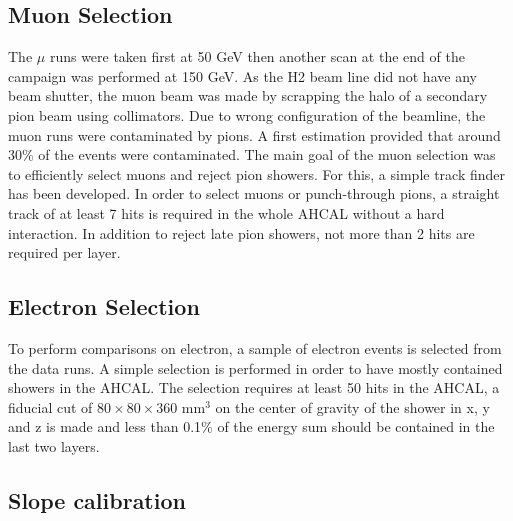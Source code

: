 \documentclass[twoside,a4paper,11pt]{article}
\begin{document}
\subsection{Muon Selection}

The $\mu$ runs were taken first at 50 GeV then another scan at the end of the campaign was performed at 150 GeV. As the H2 beam line did not have any beam shutter, the muon beam was made by scrapping the halo of a secondary pion beam using collimators. Due to wrong configuration of the beamline, the muon runs were contaminated by pions. A first estimation provided that around 30\% of the events were contaminated. The main goal of the muon selection was to efficiently select muons and reject pion showers. For this, a simple track finder has been developed. In order to select muons or punch-through pions, a straight track of at least 7 hits is required in the whole AHCAL without a hard interaction. In addition to reject late pion showers, not more than 2 hits are required per layer.

\subsection{Electron Selection}
\label{subsec:elec_sel}

To perform comparisons on electron, a sample of electron events is selected from the data runs. A simple selection is performed in order to have mostly contained showers in the AHCAL. The selection requires at least 50 hits in the AHCAL, a fiducial cut of $80\times80\times360$ mm$^3$ on the center of gravity of the shower in x, y and z is made and less than 0.1\% of the energy sum should be contained in the last two layers.

\subsection{Slope calibration}
\label{subsec:slope_calib}
\end{document}
